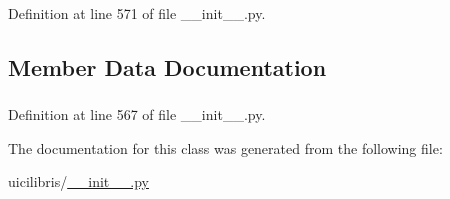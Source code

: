 \-Definition at line 571 of file \-\_\-\-\_\-init\-\_\-\-\_\-.\-py.



\subsection{\-Member \-Data \-Documentation}
\hypertarget{classuicilibris_1_1latexViewThread_a2280202512f395afb09e42f820d27fad}{
\subsubsection[{pdf\-File\-Name}]{}}\label{classuicilibris_1_1latexViewThread_a2280202512f395afb09e42f820d27fad}


\-Definition at line 567 of file \-\_\-\-\_\-init\-\_\-\-\_\-.\-py.



\-The documentation for this class was generated from the following file\-:\begin{DoxyCompactItemize}
\item 
uicilibris/\hyperlink{____init_____8py}{\-\_\-\-\_\-init\-\_\-\-\_\-.\-py}\end{DoxyCompactItemize}
